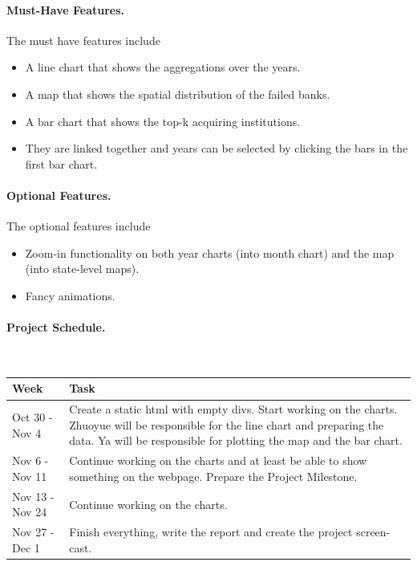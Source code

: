 \paragraph{Must-Have Features.} The must have features include

\begin{itemize}
    \item A line chart that shows the aggregations over the years.

    \item A map that shows the spatial distribution of the failed banks.

    \item A bar chart that shows the top-k acquiring institutions.

    \item They are linked together and years can be selected by clicking the
        bars in the first bar chart.
\end{itemize}

\paragraph{Optional Features.} The optional features include

\begin{itemize}
    \item Zoom-in functionality on both year charts (into month chart)
         and the map (into state-level maps).

     \item Fancy animations.
\end{itemize}

\paragraph{Project Schedule.} $\quad$

\begin{center}
\begin{tabular}{l|p{10cm}}
    \hline
    Week & Task \\\hline
    Oct 30 - Nov 4 & Create a static html with empty divs. Start working on
    the charts. Zhuoyue will be responsible for the line chart and preparing
    the data. Ya will be responsible for plotting the map and the bar chart.
    \\\hline 
    Nov 6 - Nov 11 & Continue working on the charts and at least be able to
    show something on the webpage. Prepare the Project Milestone.\\\hline
    Nov 13 - Nov 24 & Continue working on the charts. \\\hline
    Nov 27 - Dec 1 & Finish everything, write the report and create the project
    screen-cast. \\\hline
\end{tabular}
\end{center}

